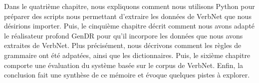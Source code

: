 Dans le quatrième chapitre, nous expliquons comment nous utilisons Python pour préparer des scripts nous permettant d'extraire les données de VerbNet que nous désirions importer. Puis, le cinquième chapitre décrit comment nous avons adapté le réalisateur profond GenDR pour qu'il incorpore les données que nous avons extraites de VerbNet. Plus précisément, nous décrivons comment les règles de grammaire ont été adpatées, ainsi que les dictionnaires. Puis, le sixième chapitre comporte une évaluation du système basée sur le corpus de VerbNet. Enfin, la conclusion fait une synthèse de ce mémoire et évoque quelques pistes à explorer.
